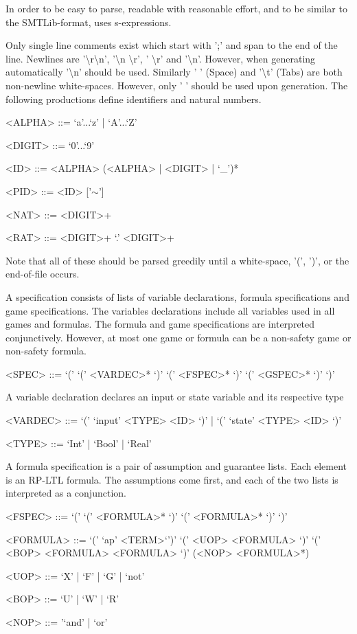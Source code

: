 
In order to be easy to parse, readable with reasonable effort, and to be similar to the SMTLib-format, \llissy uses s-expressions.

Only single line comments exist which start with \textsf{';'} and span to the end of the line. 
Newlines are \textsf{'\textbackslash r\textbackslash n', '\textbackslash n \textbackslash r', ' \textbackslash r'} and \textsf{'\textbackslash n'}. 
However, when generating \llissy automatically \textsf{'\textbackslash n'} should be used. 
Similarly \textsf{' '} (Space) and \textsf{'\textbackslash t'} (Tabs) are both non-newline white-spaces. 
However, only \textsf{' '} should be used upon generation. 
The following productions define identifiers and natural numbers.
\begin{grammar}
<ALPHA> ::= `a'...`z' | `A'...`Z' 

<DIGIT> ::= `0'...`9'

<ID>    ::= <ALPHA> (<ALPHA> | <DIGIT> | `_')*

<PID>   ::= <ID> ['$\sim$']

<NAT>   ::=  <DIGIT>+

<RAT>   ::=  <DIGIT>+ `.' <DIGIT>+
\end{grammar}

\noindent
Note that all of these should be parsed greedily until a white-space, '(', ')', or the end-of-file occurs.

A \llissy specification consists of lists of variable declarations, formula specifications and game specifications. The variables declarations include all variables used in all games and formulas. 
The formula and game specifications are interpreted conjunctively. 
However, at most one game or formula can be a non-safety game or non-safety formula.

\begin{grammar}
<SPEC> ::= `(' `(' <VARDEC>* `)' `(' <FSPEC>* `)' `(' <GSPEC>*  `)' `)'
\end{grammar}

\noindent
A variable declaration declares an input or state variable and its respective type
\begin{grammar}
<VARDEC>  ::= `(' `input' <TYPE> <ID> `)' | `(' `state' <TYPE> <ID> `)'

<TYPE>   ::=  `Int' | `Bool' | `Real'
\end{grammar}

A formula specification is a pair of assumption and guarantee lists. Each element is an RP-LTL formula.
The assumptions come first, and each of the two lists is interpreted as a conjunction. 
\begin{grammar}
<FSPEC>   ::= `(' `(' <FORMULA>* `)' `(' <FORMULA>* `)' `)'

<FORMULA> ::= `(' `ap' <TERM>`')' \alt `(' <UOP> <FORMULA> `)' \alt `(' <BOP> <FORMULA> <FORMULA> `)' \alt (<NOP> <FORMULA>*)

<UOP>     ::= `X' | `F' | `G' | `not'

<BOP>     ::= `U' | `W' | `R'

<NOP>     ::= '`and' | `or'
\end{grammar}

